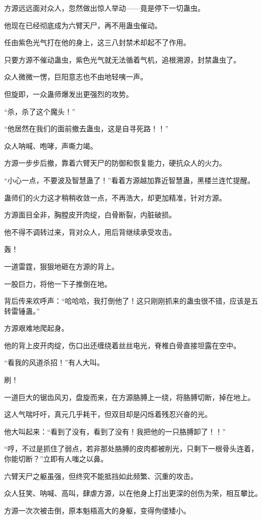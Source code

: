 \begin{this_body}
方源远远面对众人，忽然做出惊人举动——竟是停下一切蛊虫。

他现在已经彻底成为六臂天尸，再不用蛊虫催动。

任由紫色光气打在他的身上，这三八封禁术却起不了作用。

只要方源不催动蛊虫，紫色光气就无法循着气机，追根溯源，封禁蛊虫了。

众人微微一愣，巨阳意志也不由地轻咦一声。

但旋即，一众蛊师爆发出更强烈的攻势。

“杀，杀了这个魔头！”

“他居然在我们的面前撤去蛊虫，这是自寻死路！！”

众人呐喊、咆哮，声嘶力竭。

方源一步步后撤，靠着六臂天尸的防御和恢复能力，硬抗众人的火力。

“小心一点，不要波及智慧蛊了！”看着方源越加靠近智慧蛊，黑楼兰连忙提醒。

蛊师们的火力这才稍稍收敛一点，不再浩大，却更加精准，针对方源。

方源面目全非，胸膛皮开肉绽，白骨断裂，内脏破损。

他不得不调转过来，背对众人，用后背继续承受攻击。

轰！

一道雷霆，狠狠地砸在方源的背上。

一股巨力，将他一下子推倒在地。

背后传来欢呼声：“哈哈哈，我打倒他了！这只刚刚抓来的蛊虫很不错，应该是五转雷锤蛊。”

方源艰难地爬起身。

他的背上皮开肉绽，伤口出还缠绕着丝丝电光，脊椎白骨直接坦露在空中。

“看我的风道杀招！”有人大叫。

刷！

一道巨大的锯齿风刃，盘旋而来，在方源胳膊上一绕，将胳膊切断，掉在地上。

这人气喘吁吁，真元几乎耗干，但双目却是闪烁着残忍兴奋的光。

他大叫起来：“看到了没有，看到了没有！我把他的一只胳膊卸了！！”

“哼，不过是抓住了弱点，若非那处胳膊的皮肉都被削光，只剩下一根骨头连着，你能切断？”立即有人嗤之以鼻。

六臂天尸之躯虽强，但终究不能抵挡如此频繁、沉重的攻击。

众人狂笑、呐喊、高叫，肆虐方源，以在他身上打出更深的创伤为荣，相互攀比。

方源一次次被击倒，原本魁梧高大的身躯，变得佝偻矮小。


\end{this_body}
